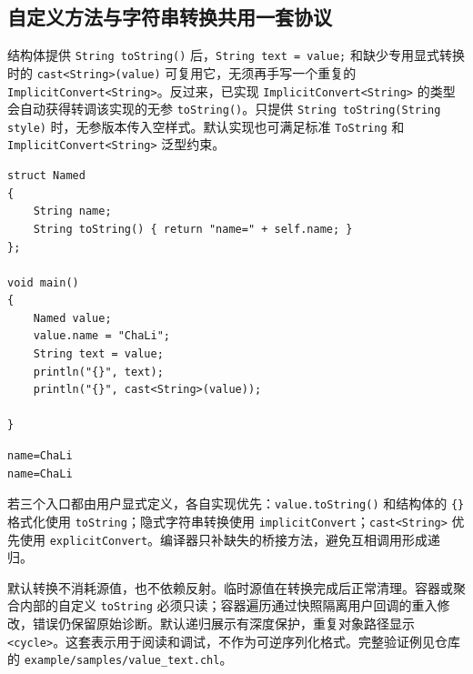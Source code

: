 \subsection{自定义方法与字符串转换共用一套协议}

结构体提供 \texttt{String to\allowbreak{}String(\allowbreak{})\allowbreak{}} 后，\texttt{String text =\allowbreak{} value;} 和缺少专用显式转换时的 \texttt{cast<\allowbreak{}String>\allowbreak{}(\allowbreak{}value)\allowbreak{}} 可复用它，无须再手写一个重复的 \texttt{Implicit\allowbreak{}Convert<\allowbreak{}String>\allowbreak{}}。反过来，已实现 \texttt{Implicit\allowbreak{}Convert<\allowbreak{}String>\allowbreak{}} 的类型会自动获得转调该实现的无参 \texttt{to\allowbreak{}String(\allowbreak{})\allowbreak{}}。只提供 \texttt{String to\allowbreak{}String(\allowbreak{}String style)\allowbreak{}} 时，无参版本传入空样式。默认实现也可满足标准 \texttt{To\allowbreak{}String} 和 \texttt{Implicit\allowbreak{}Convert<\allowbreak{}String>\allowbreak{}} 泛型约束。

\par
\medskip
\begin{lstlisting}[style=chali]
struct Named
{
    String name;
    String toString() { return "name=" + self.name; }
};

void main()
{
    Named value;
    value.name = "ChaLi";
    String text = value;
    println("{}", text);
    println("{}", cast<String>(value));

}
\end{lstlisting}
\par
\medskip

\par
\medskip
\begin{lstlisting}[style=out]
name=ChaLi
name=ChaLi
\end{lstlisting}
\par
\medskip

若三个入口都由用户显式定义，各自实现优先：\texttt{value.\allowbreak{}to\allowbreak{}String(\allowbreak{})\allowbreak{}} 和结构体的 \texttt{\{\}} 格式化使用 \texttt{to\allowbreak{}String}；隐式字符串转换使用 \texttt{implicit\allowbreak{}Convert}；\texttt{cast<\allowbreak{}String>\allowbreak{}} 优先使用 \texttt{explicit\allowbreak{}Convert}。编译器只补缺失的桥接方法，避免互相调用形成递归。

默认转换不消耗源值，也不依赖反射。临时源值在转换完成后正常清理。容器或聚合内部的自定义 \texttt{to\allowbreak{}String} 必须只读；容器遍历通过快照隔离用户回调的重入修改，错误仍保留原始诊断。默认递归展示有深度保护，重复对象路径显示 \texttt{<\allowbreak{}cycle>\allowbreak{}}。这套表示用于阅读和调试，不作为可逆序列化格式。完整验证例见仓库的 \texttt{example/\allowbreak{}samples/\allowbreak{}value\_text.\allowbreak{}chl}。

